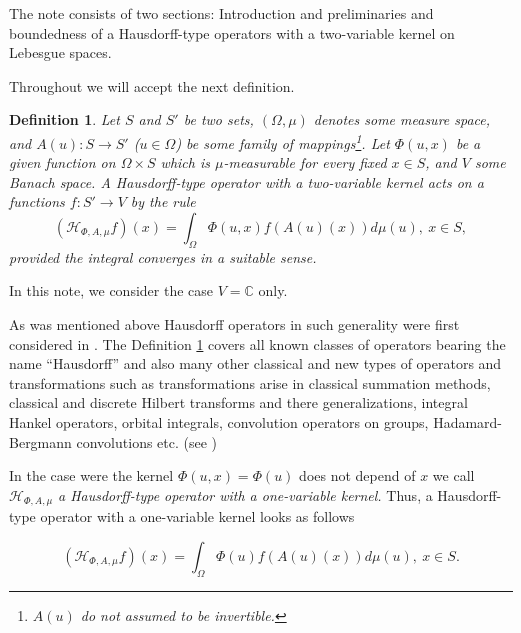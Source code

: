 \documentclass[12pt,reqno]{amsart}
\newtheorem{definition}[theorem]{Definition}
\begin{document}
  The note  consists of two sections: Introduction  and preliminaries and  boundedness  of a  Hausdorff-type operators with a two-variable kernel  on Lebesgue spaces.

Throughout  we will accept the next definition.

\begin{definition}\label{df:general1_two}  Let  $S$ and  $S'$ be two sets, $(\Omega,\mu)$ denotes some measure space, and $A(u): S\to S'$ ($u\in  \Omega $) be some family of mappings\footnote{$A(u)$ do not assumed to be invertible.}.  Let  $\Phi(u,x)$ be a given  function on $\Omega\times S$ which is $\mu$-measurable for every fixed $x\in S$, and $V$ some Banach space.
 {\it A Hausdorff-type operator  with a two-variable kernel} acts on a  functions $f: S' \to V$  by the rule
\begin{equation}\label{general_two}
(\mathcal{H}_{\Phi,A,\mu}f)(x) =\int_{\Omega} \Phi(u,x)f(A(u)(x))d\mu(u), \ x\in S,
\end{equation}
provided the integral  converges in a suitable  sense.
\end{definition}
In this note, we consider the case  $V=\mathbb{C}$ only.


As was mentioned above Hausdorff operators in such generality were first considered in \cite{Mir_Lobach}.
 The Definition \ref{df:general1_two}  covers all known classes of operators bearing the name ``Hausdorff'' and also many other classical and new types of operators and transformations such as  transformations arise in  classical summation methods,  classical and  discrete Hilbert transforms and there generalizations, integral Hankel operators, orbital integrals,  convolution operators on groups, Hadamard-Bergmann convolutions etc. 
  (see \cite{LM:survey, arxGeneral})


In the case were the kernel $\Phi(u,x)=\Phi(u)$ does not depend of $x$ we call $\mathcal{H}_{\Phi,A,\mu}$ {\it a Hausdorff-type operator  with a one-variable kernel.} Thus, a Hausdorff-type operator  with a one-variable kernel looks as follows

\begin{equation}\label{general_one}
(\mathcal{H}_{\Phi,A,\mu}f)(x) =\int_{\Omega} \Phi(u)f(A(u)(x))d\mu(u), \ x\in S.
\end{equation}
\end{document}
